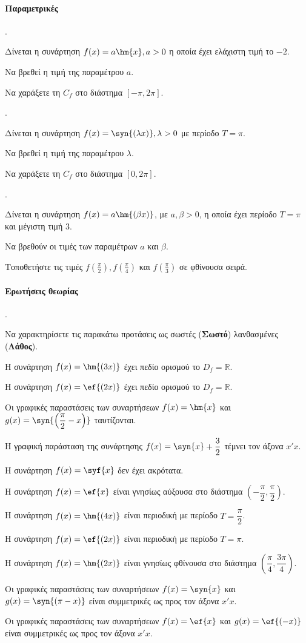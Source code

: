 \documentclass[11pt,a4paper,twocolumn]{article}
\newcounter{askhsh}
\newcommand{\askhsh}{{\large\theaskhsh.}\ \addtocounter{askhsh}{1}}
\begin{document}
\paragraph{Παραμετρικές}
\askhsh Δίνεται η συνάρτηση $f(x)=a\hm{x}, a>0$ η οποία έχει ελάχιστη τιμή το $-2$.
\begin{alist}
\item Να βρεθεί η τιμή της παραμέτρου $a$.
\item Να χαράξετε τη $C_f$ στο διάστημα $[-\pi,2\pi]$.
\end{alist}
\askhsh Δίνεται η συνάρτηση $f(x)=\syn{(\lambda x)}, \lambda>0$ με περίοδο $T=\pi$.
\begin{alist}
\item Να βρεθεί η τιμή της παραμέτρου $\lambda$.
\item Να χαράξετε τη $C_f$ στο διάστημα $[0,2\pi]$.
\end{alist}
\askhsh Δίνεται η συνάρτηση $f(x)=a\hm{(\beta x)}$, με $a,\beta>0$, η οποία έχει περίοδο $T=\pi$ και μέγιστη τιμή $3$.
\begin{alist}
\item Να βρεθούν οι τιμές των παραμέτρων $a$ και $\beta$.
\item Τοποθετήστε τις τιμές $f\left(\frac{\pi}{2}\right),f\left(\frac{\pi}{4}\right)$ και $f\left(\frac{\pi}{3}\right)$ σε φθίνουσα σειρά.
\item 
\end{alist}
\paragraph{Ερωτήσεις θεωρίας}
\askhsh Να χαρακτηρίσετε τις παρακάτω προτάσεις ως σωστές (\textbf{Σωστό}) λανθασμένες (\textbf{Λάθος}).
\begin{alist}
\item Η συνάρτηση $f(x)=\hm{(3x)}$ έχει πεδίο ορισμού το $D_f=\mathbb{R}$.
\item Η συνάρτηση $f(x)=\ef{(2x)}$ έχει πεδίο ορισμού το $D_f=\mathbb{R}$.
\item Οι γραφικές παραστάσεις των συναρτήσεων $f(x)=\hm{x}$ και $g(x)=\syn{\left(\dfrac{\pi}{2}-x\right)}$ ταυτίζονται.
\item Η γραφική παράσταση της συνάρτησης $f(x)=\syn{x}+\dfrac{3}{2}$ τέμνει τον άξονα $x'x$.
\item Η συνάρτηση $f(x)=\syf{x}$ δεν έχει ακρότατα.
\item Η συνάρτηση $f(x)=\ef{x}$ είναι γνησίως αύξουσα στο διάστημα $\left(-\dfrac{\pi}{2},\dfrac{\pi}{2}\right)$.
\item Η συνάρτηση $f(x)=\hm{(4x)}$ είναι περιοδική με περίοδο $T=\dfrac{\pi}{2}$.
\item Η συνάρτηση $f(x)=\ef{(2x)}$ είναι περιοδική με περίοδο $T=\pi$.
\item Η συνάρτηση $f(x)=\hm{(2x)}$ είναι γνησίως φθίνουσα στο διάστημα $\left(\dfrac{\pi}{4},\dfrac{3\pi}{4}\right)$.
\item Οι γραφικές παραστάσεις των συναρτήσεων $f(x)=\syn{x}$ και $g(x)=\syn{(\pi-x)}$ είναι συμμετρικές ως προς τον άξονα $x'x$.
\item Οι γραφικές παραστάσεις των συναρτήσεων $f(x)=\ef{x}$ και $g(x)=\ef{(-x)}$ είναι συμμετρικές ως προς τον άξονα $x'x$.
\end{alist}
\end{document}
